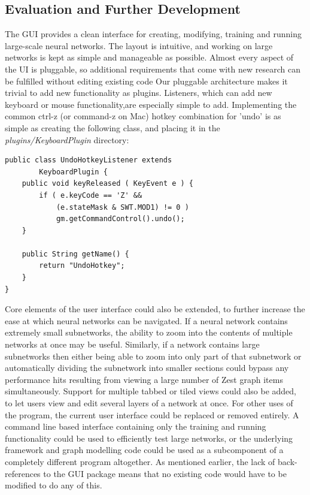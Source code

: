 \documentclass{acm_proc_article-sp}
\begin{document}
\subsection{Evaluation and Further Development}
{
The GUI provides a clean interface for creating, modifying, training and running large-scale neural networks. The layout is intuitive, and working on large networks is kept as simple and manageable as possible. Almost every aspect of the UI is pluggable, so additional requirements that come with new research can be fulfilled without editing existing code
Our pluggable architecture makes it trivial to add new functionality as plugins. Listeners, which can add new keyboard or mouse functionality,are especially simple to add. Implementing the common ctrl-z (or command-z on Mac) hotkey combination for 'undo' is as simple as creating the following class, and placing it in the {\textit{plugins/KeyboardPlugin}} directory:
\newpage
\begin{verbatim}
public class UndoHotkeyListener extends 
        KeyboardPlugin {
    public void keyReleased ( KeyEvent e ) {
        if ( e.keyCode == 'Z' && 
            (e.stateMask & SWT.MOD1) != 0 )
            gm.getCommandControl().undo();
    }

    public String getName() {
        return "UndoHotkey";
    } 
}
\end{verbatim}

Core elements of the user interface could also be extended, to further increase the ease at which neural networks can be navigated. If a neural network contains extremely small subnetworks, the ability to zoom into the contents of multiple networks at once may be useful. Similarly, if a network contains large subnetworks then either being able to zoom into only part of that subnetwork or automatically dividing the subnetwork into smaller sections could bypass any performance hits resulting from viewing a large number of Zest graph items simultaneously. Support for multiple tabbed or tiled views could also be added, to let users view and edit several layers of a network at once.
For other uses of the program, the current user interface could be replaced or removed entirely. A command line based interface containing only the training and running functionality could be used to efficiently test large networks, or the underlying framework and graph modelling code could be used as a subcomponent of a completely different program altogether. As mentioned earlier, the lack of back-references to the GUI package means that no existing code would have to be modified to do any of this.
}
\end{document}
